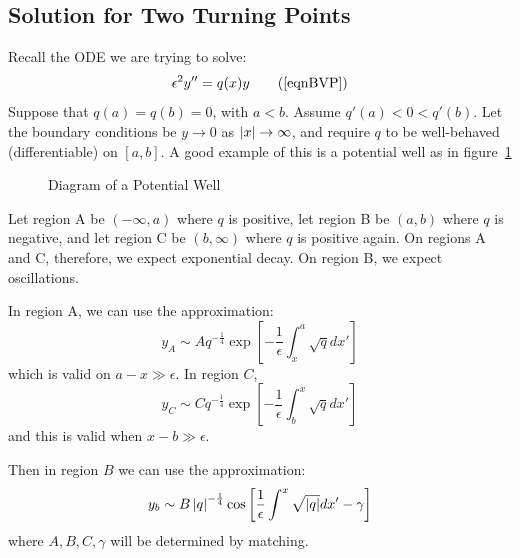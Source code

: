 \documentclass[../Main.tex]{subfiles}
\begin{document}
\subsection{Solution for Two Turning Points}
Recall the ODE we are trying to solve:
\begin{equation*}
    \epsilon^2 y'' = q(x) y
    \tag{\ref{eqnBVP}}
\end{equation*}
Suppose that $q(a) = q(b) = 0$, with $a < b$. Assume $q'(a) < 0 < q'(b)$. Let the boundary conditions be $y \to 0$ as $\left|x\right| \to \infty$, and require $q$ to be well-behaved (differentiable) on $[a, b]$. A good example of this is a potential well as in figure~\ref{figPotentialWell}
\begin{figure}
    \centering
    \caption{Diagram of a Potential Well}
    \label{figPotentialWell}
\end{figure}

Let region A be $(-\infty, a)$ where $q$ is positive, let region B be $(a, b)$ where $q$ is negative, and let region C be $(b, \infty)$ where $q$ is positive again. On regions A and C, therefore, we expect exponential decay. On region B, we expect oscillations.

In region A, we can use the approximation:
\begin{equation*}
    y_A \sim A q^{-\frac14} \exp \left[-\frac1\epsilon \int_x^a \sqrt{q} dx'\right]
\end{equation*}
which is valid on $a - x \gg \epsilon$. In region $C$,
\begin{equation*}
    y_C \sim Cq^{-\frac14} \exp\left[-\frac1\epsilon \int_b^x \sqrt{q} dx'\right]
\end{equation*}
and this is valid when $x - b \gg \epsilon$.

Then in region $B$ we can use the approximation:
\begin{equation*}
    y_b \sim B \left|q\right|^{-\frac14} \cos\left[\frac1\epsilon \int^x \sqrt{\left|q\right|} dx' - \gamma\right]
\end{equation*}
where $A, B, C, \gamma$ will be determined by matching.
\end{document}
